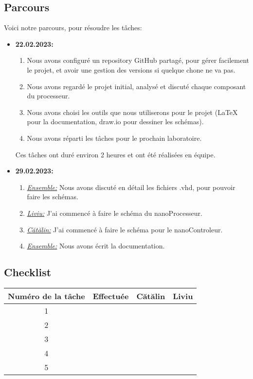 \documentclass{article}
\begin{document}
    \subsection{Parcours}
    Voici notre parcours, pour résoudre les tâches:
    \begin{itemize}
        \item \textbf{22.02.2023:}
        \begin{enumerate}
            \item Nous avons configuré un repository GitHub partagé, pour gérer facilement le projet, et avoir une gestion des versions si quelque chone ne va pas.
            \item Nous avons regardé le projet initial, analysé et discuté chaque composant du processeur.
            \item Nous avons choisi les outils que nous utiliserons pour le projet (LaTeX pour la documentation, draw.io pour dessiner les schémas).
            \item Nous avons réparti les tâches pour le prochain laboratoire.
        \end{enumerate}
        Ces tâches ont duré environ 2 heures et ont été réalisées en équipe.
        \item \textbf{29.02.2023:}
        \begin{enumerate}
            \item \textit{\underline{Ensemble:}} Nous avons discuté en détail les fichiers .vhd, pour pouvoir faire les schémas.
            \item \textit{\underline{Liviu:}} J'ai commencé à faire le schéma du nanoProcesseur.
            \item \textit{\underline{Cătălin:}} J'ai commencé à faire le schéma pour le nanoControleur.
            \item \textit{\underline{Ensemble:}} Nous avons écrit la documentation.

        \end{enumerate}
    \end{itemize}
    \subsection{Checklist}
    \begin{center}
        \begin{tabular}{|c|c|c|c|}
            \hline
            Numéro de la tâche & Effectuée & Cătălin & Liviu \\
            \hline
            \hline 1 &   &   &   \\ 
            \hline 2 &   &   &   \\
            \hline 3 &   &   &   \\
            \hline 4 &   &   &   \\
            \hline 5 &   &   &   \\
            \hline
        \end{tabular}
    \end{center}
    \newpage
\end{document}
